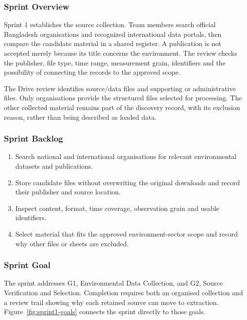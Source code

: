 \subsubsection{Sprint Overview}

Sprint 1 establishes the source collection. Team members search official
Bangladesh organisations and recognized international data portals, then
compare the candidate material in a shared register. A publication is not
accepted merely because its title concerns the environment. The review checks
the publisher, file type, time range, measurement grain, identifiers and the
possibility of connecting the records to the approved scope.

The Drive review identifies \mSourceDataFiles{} source/data files and
\mSupportFiles{} supporting or administrative files. Only
\mSourceOrganisations{} organisations provide the \mSourceFiles{} structured
files selected for processing. The other
collected material remains part of the discovery record, with its exclusion
reason, rather than being described as loaded data.

\subsubsection{Sprint Backlog}

\begin{enumerate}[leftmargin=*]
  \item Search national and international organisations for relevant
  environmental datasets and publications.
  \item Store candidate files without overwriting the original downloads and
  record their publisher and source location.
  \item Inspect content, format, time coverage, observation grain and usable
  identifiers.
  \item Select material that fits the approved environment-sector scope and
  record why other files or sheets are excluded.
\end{enumerate}

\subsubsection{Sprint Goal}

The sprint addresses G1, Environmental Data Collection, and G2, Source
Verification and Selection. Completion requires both an organised collection
and a review trail showing why each retained source can move to extraction.
Figure~\ref{fig:sprint1-goals} connects the sprint directly to those goals.

